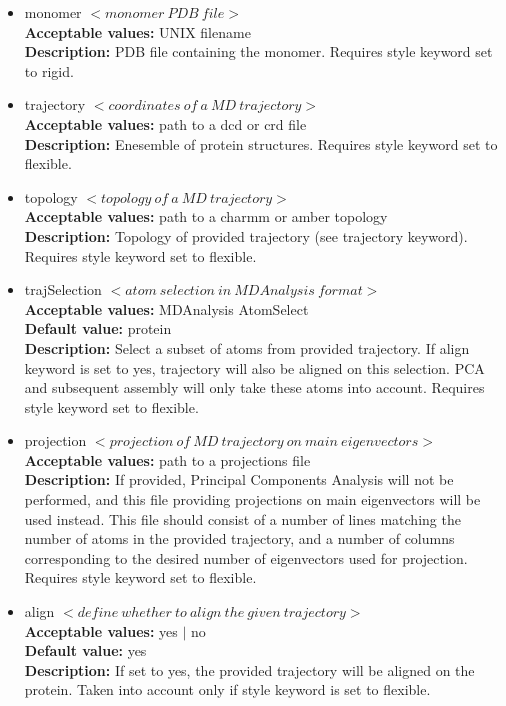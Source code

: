 \documentclass[a4paper, 12pt]{article}
\begin{document}
\begin{itemize}
\item monomer $< monomer\ PDB\ file >$\\
\textbf{Acceptable values:} UNIX filename\\
\textbf{Description:} PDB file containing the monomer. Requires style keyword set to rigid.

\item trajectory $< coordinates\ of\ a\ MD\ trajectory >$\\
\textbf{Acceptable values:} path to a dcd or crd file\\
\textbf{Description:} Enesemble of protein structures. Requires style keyword set to flexible.

\item topology $< topology\ of\ a\ MD\ trajectory >$\\
\textbf{Acceptable values:} path to a charmm or amber topology\\
\textbf{Description:} Topology of provided trajectory (see trajectory keyword). Requires style keyword set to flexible.

\item trajSelection $< atom\ selection\ in\ MDAnalysis\ format >$\\
\textbf{Acceptable values:} MDAnalysis AtomSelect\\
\textbf{Default value:} protein\\
\textbf{Description:} Select a subset of atoms from provided trajectory. If align keyword is set to yes, trajectory will also be aligned on this selection. PCA and subsequent assembly will only take these atoms into account. Requires style keyword set to flexible.

\item projection $< projection\ of\ MD\ trajectory\ on\ main\ eigenvectors >$\\
\textbf{Acceptable values:} path to a projections file\\
\textbf{Description:} If provided, Principal Components Analysis will not be performed, and this file providing projections on main eigenvectors will be used instead. This file should consist of a number of lines matching the number of atoms in the provided trajectory, and a number of columns corresponding to the desired number of eigenvectors used for projection. Requires style keyword set to flexible.

\item align $< define\ whether\ to\ align\ the\ given\ trajectory >$\\
\textbf{Acceptable values:} yes $|$ no\\
\textbf{Default value:} yes\\
\textbf{Description:}  If set to yes, the provided trajectory will be aligned on the protein. Taken into account only if style keyword is set to flexible.


\end{itemize}
\end{document}
